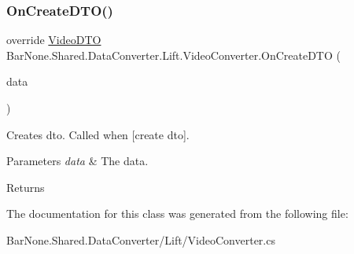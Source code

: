 \subsubsection{\texorpdfstring{On\+Create\+D\+T\+O()}{OnCreateDTO()}}
{\footnotesize\ttfamily override \mbox{\hyperlink{class_bar_none_1_1_shared_1_1_data_transfer_1_1_video_d_t_o}{Video\+D\+TO}} Bar\+None.\+Shared.\+Data\+Converter.\+Lift.\+Video\+Converter.\+On\+Create\+D\+TO (\begin{DoxyParamCaption}\item[{\mbox{\hyperlink{class_bar_none_1_1_shared_1_1_domain_model_1_1_video_record}{Video\+Record}}}]{data }\end{DoxyParamCaption})}



Creates dto. Called when \mbox{[}create dto\mbox{]}. 


\begin{DoxyParams}{Parameters}
{\em data} & The data.\\
\hline
\end{DoxyParams}
\begin{DoxyReturn}{Returns}

\end{DoxyReturn}


The documentation for this class was generated from the following file\+:\begin{DoxyCompactItemize}
\item 
Bar\+None.\+Shared.\+Data\+Converter/\+Lift/Video\+Converter.\+cs\end{DoxyCompactItemize}
